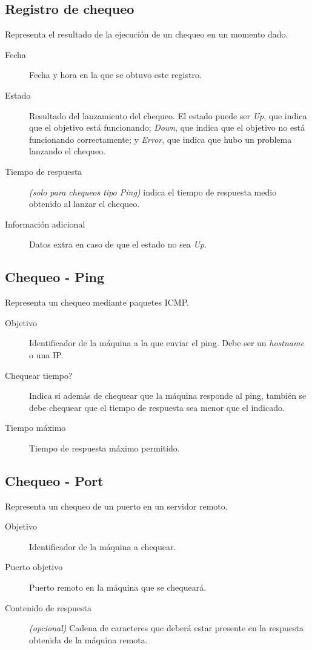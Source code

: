 \subsection{Registro de chequeo}

Representa el resultado de la ejecución de un chequeo en un momento dado.

\begin{description}
\item[Fecha] Fecha y hora en la que se obtuvo este registro.
\item[Estado] Resultado del lanzamiento del chequeo. El estado puede ser
  \textit{Up}, que indica que el objetivo está funcionando; \textit{Down}, que
  indica que el objetivo no está funcionando correctamente; y \textit{Error},
  que indica que hubo un problema lanzando el chequeo.
\item[Tiempo de respuesta] \textit{(solo para chequeos tipo Ping)} indica el
  tiempo de respuesta medio obtenido al lanzar el chequeo.
\item[Información adicional] Datos extra en caso de que el estado no sea \textit{Up}.
\end{description}

\subsection{Chequeo - Ping}

Representa un chequeo mediante paquetes ICMP.

\begin{description}
\item[Objetivo] Identificador de la máquina a la que enviar el ping. Debe ser un
  \textit{hostname} o una IP.
\item[Chequear tiempo?] Indica si además de chequear que la máquina responde al
  ping, también se debe chequear que el tiempo de respuesta sea menor que el indicado.
\item[Tiempo máximo] Tiempo de respuesta máximo permitido.
\end{description}

\subsection{Chequeo - Port}

Representa un chequeo de un puerto en un servidor remoto.

\begin{description}
\item[Objetivo] Identificador de la máquina a chequear.
\item[Puerto objetivo] Puerto remoto en la máquina que se chequeará.
\item[Contenido de respuesta] \textit{(opcional)} Cadena de caracteres que
  deberá estar presente en la respuesta obtenida de la máquina remota.
\end{description}

